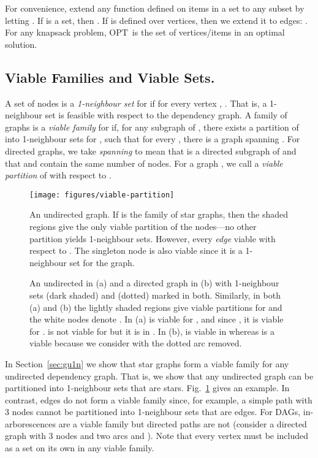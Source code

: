 \documentclass[12pt]{article}
\newcommand{\OPT}{\ensuremath{\mathrm{OPT}\xspace}}
\begin{document}
For convenience, extend any function  defined on items in a set 
to any subset  by letting .
If  is a set, then .  If  is
defined over vertices, then we extend it to edges: .  For any knapsack problem, \OPT~is the set of
vertices/items in an optimal solution.

\subsection{Viable Families and Viable Sets.}



A set of nodes  is a {\em 1-neighbour set} for  if for every vertex , .  That is, a 1-neighbour set is feasible with respect to the dependency graph.  A family of graphs  is a {\em viable family} for  if, for any subgraph  of , there exists a partition  of  into 1-neighbour sets for , such that for every , there is a graph  spanning .  For directed graphs, we take {\em spanning} to mean that  is a directed subgraph of  and that  and  contain the same number of nodes.  For a graph ,  we call  a {\em viable partition} of  with respect to .

\begin{figure}[bt]
\centering\texttt{[image: figures/viable-partition]}
\caption{ \label{fig:viable-partition}  An undirected graph.   If  is the family of star graphs, then the shaded regions give the only viable partition of the nodes---no other partition yields 1-neighbour sets.  However, every {\em edge} viable with respect to .  The singleton node is also viable since it is a 1-neighbour set for the graph.}
\end{figure}


\begin{figure}[tb]
\centering
{}
\caption{ \label{fig:viable-partition-lemma}  An undirected  in (a) and a directed graph  in (b) with 1-neighbour sets  (dark shaded) and  (dotted) marked in both.  Similarly, in both (a) and (b) the lightly shaded regions give viable partitions for  and the white nodes denote .  In (a)  is viable for , and since , it is viable for .   is not viable for  but it is in .  In (b),  is viable in  whereas  is a viable because we consider  with the dotted arc removed.}
\end{figure}

In Section~\ref{sec:gu1n} we show that star graphs form a viable
family for any undirected dependency graph.  That is, we show that any
undirected graph can be partitioned into 1-neighbour sets that are
stars.  Fig.~\ref{fig:viable-partition} gives an example.  In
contrast, edges do not form a viable family since, for example, a
simple path with 3 nodes cannot be partitioned into 1-neighbour sets
that are edges.  For DAGs, in-arborescences are a viable family  but
directed paths are not  (consider a directed graph with 3 nodes
 and two arcs  and ).  Note that every vertex
must be included as a set on its own in any viable family.
\end{document}

